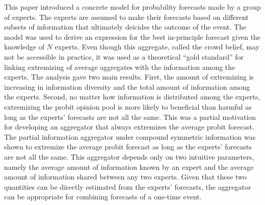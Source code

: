 \documentclass[11pt]{article}
\theoremstyle{definition}
\theoremstyle{definition}
\begin{document}


This paper introduced a concrete model for probability forecasts made by a group of experts. The experts are assumed to make their forecasts based on different subsets of information that ultimately deicides the outcome of the event. The model was used to derive an expression for the best in-principle forecast given the knowledge of $N$ experts. Even though this aggregate, called the crowd belief, may not be accessible in practice, it was used as a theoretical ``gold standard'' for linking extremizing of average aggregates with the information among the experts. The analysis gave two main results. First, the amount of extremizing is increasing in information diversity and the total amount of information among the experts. Second, no matter how information is distributed among the experts, extremizing the probit opinion pool is more likely to beneficial than harmful as long as the experts' forecasts are not all the same. This was a partial motivation for developing an aggregator that always extremizes the average probit forecast. The partial information aggregator under compound symmetric information was shown to extremize the average probit forecast as long as the experts' forecasts are not all the same. This aggregator depends only on two intuitive parameters, namely the average amount of information known by an expert and the average amount of information shared between any two experts. Given that these two quantities can be directly estimated from the experts' forecasts, the aggregator can be appropriate for combining forecasts of a one-time event. 
\end{document}

